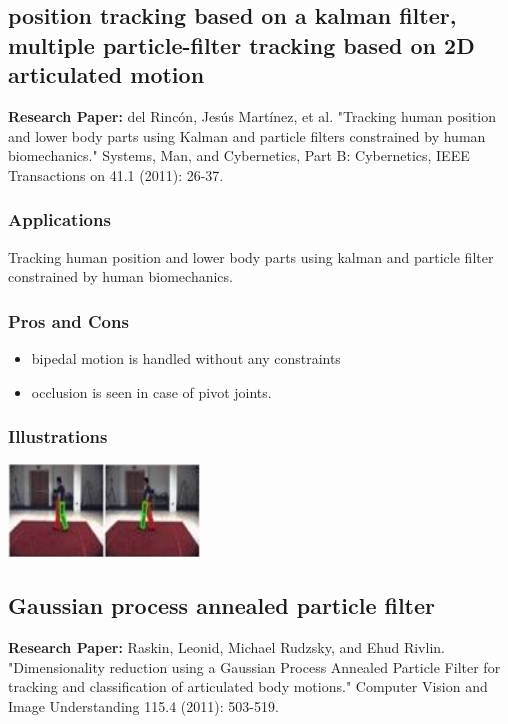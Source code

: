 \documentclass[a4paper,10pt]{report}
\begin{document}
\subsection{position tracking based on a kalman filter, multiple particle-filter tracking based on 2D articulated motion}
\textbf{Research Paper:} del Rincón, Jesús Martínez, et al. "Tracking human position and lower body parts using Kalman and particle filters constrained by human biomechanics." Systems, Man, and Cybernetics, Part B: Cybernetics, IEEE Transactions on 41.1 (2011): 26-37.
\subsubsection{Applications}
Tracking human position and lower body parts using kalman and particle filter constrained by human biomechanics.
\subsubsection{Pros and Cons}
\begin{itemize}
 \item bipedal motion is handled without any constraints
 \item occlusion is seen in case of pivot joints.
\end{itemize}
\subsubsection{Illustrations}\newline\newline
\includegraphics{./skeltrack4.png}
\newline \newline

\subsection{Gaussian process annealed particle filter}
\textbf{Research Paper:} Raskin, Leonid, Michael Rudzsky, and Ehud Rivlin. "Dimensionality reduction using a Gaussian Process Annealed Particle Filter for tracking and classification of articulated body motions." Computer Vision and Image Understanding 115.4 (2011): 503-519.
\end{document}
